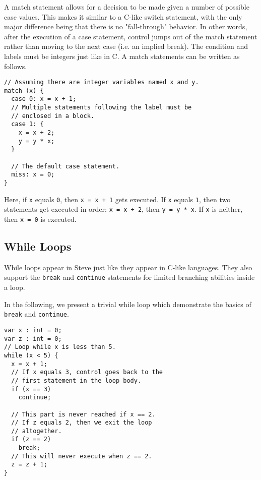 A match statement allows for a decision to be made given a number of possible case values. This makes it similar to a C-like switch statement, with the only major difference being that there is no "fall-through" behavior. In other words, after the execution of a case statement, control jumps out of the match statement rather than moving to the next case (i.e. an implied break). The condition and labels must be integers just like in C. A match statements can be written as follows.

\begin{codepage}
\begin{lstlisting}
// Assuming there are integer variables named x and y.
match (x) {
  case 0: x = x + 1;
  // Multiple statements following the label must be 
  // enclosed in a block.
  case 1: {
    x = x + 2;
    y = y * x;
  }
  
  // The default case statement.
  miss: x = 0;
}
\end{lstlisting}
\end{codepage}

Here, if \texttt{x} equals \texttt{0}, then \texttt{x = x + 1} gets executed. If \texttt{x} equals \texttt{1}, then two statements get executed in order: \texttt{x = x + 2}, then \texttt{y = y * x}. If \texttt{x} is neither, then \texttt{x = 0} is executed.

\subsection{While Loops} \label{tut:while}

While loops appear in Steve just like they appear in C-like languages. They also support the \texttt{break} and \texttt{continue} statements for limited branching abilities inside a loop.

In the following, we present a trivial while loop which demonstrate the basics of \texttt{break} and \texttt{continue}.

\begin{codepage}
\begin{lstlisting}
var x : int = 0;
var z : int = 0;
// Loop while x is less than 5.
while (x < 5) {
  x = x + 1;
  // If x equals 3, control goes back to the
  // first statement in the loop body.
  if (x == 3)
    continue;
    
  // This part is never reached if x == 2.
  // If z equals 2, then we exit the loop
  // altogether.
  if (z == 2) 
    break;
  // This will never execute when z == 2.
  z = z + 1;
}
\end{lstlisting}
\end{codepage}

